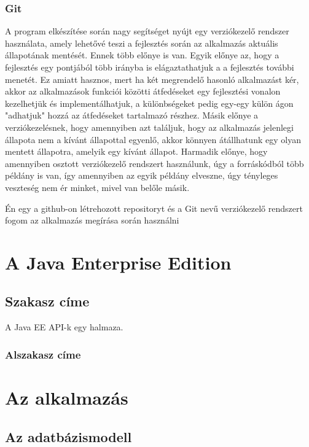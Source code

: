 \documentclass[centeredchapter]{thesis-ekf}
\theoremstyle{definition}
\theoremstyle{remark}
\begin{document}
\subsection{Git}

A program elkészítése során nagy segítséget nyújt egy verziókezelő rendszer használata, amely lehetővé teszi a fejlesztés során az alkalmazás aktuális állapotának mentését. Ennek több előnye is van. Egyik előnye az, hogy a fejlesztés egy pontjából több irányba is elágaztathatjuk a a fejlesztés további menetét. Ez amiatt hasznos, mert ha két megrendelő hasonló alkalmazást kér, akkor az alkalmazások funkciói közötti átfedéseket egy fejlesztési vonalon kezelhetjük és implementálhatjuk, a különbségeket pedig egy-egy külön ágon "adhatjuk" hozzá az átfedéseket tartalmazó részhez. Másik előnye a verziókezelésnek, hogy amennyiben azt találjuk, hogy az alkalmazás jelenlegi állapota nem a kívánt állapottal egyenlő, akkor könnyen átállhatunk egy olyan mentett állapotra, amelyik egy kívánt állapot. Harmadik előnye, hogy amennyiben osztott verziókezelő rendszert használunk, úgy a forráskódból több példány is van, így amennyiben az egyik példány elveszne, úgy tényleges veszteség nem ér minket, mivel van belőle másik.

Én egy a github-on létrehozott repositoryt és a Git nevű verziókezelő rendszert fogom az alkalmazás megírása során használni


\chapter{A Java Enterprise Edition}

\section{Szakasz címe}

A Java EE API-k egy halmaza.

\subsection{Alszakasz címe}

\chapter{Az alkalmazás}

\section{Az adatbázismodell}
\end{document}
